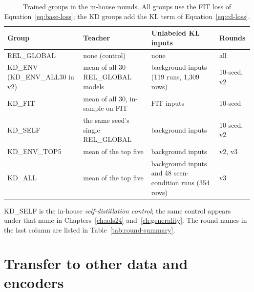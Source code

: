 \begin{table}[htbp]
\centering
\caption[Trained groups in the in-house rounds]{Trained groups in the in-house rounds. All groups use the FIT
loss of Equation~\ref{eq:base-loss}; the KD groups add the KL term of
Equation~\ref{eq:cd-loss}.}
\label{tab:variants}
\small
\begin{tabularx}{\textwidth}{@{}lXXl@{}}
\toprule
Group & Teacher & Unlabeled KL inputs & Rounds \\
\midrule
REL\_GLOBAL & none (control) & none & all \\
KD\_ENV (KD\_ENV\_ALL30 in v2) & mean of all 30 REL\_GLOBAL models
  & background inputs (119 runs, 1,309 rows) & 10-seed, v2 \\
KD\_FIT & mean of all 30, in-sample on FIT & FIT inputs & 10-seed \\
KD\_SELF & the same seed's single REL\_GLOBAL & background inputs
  & 10-seed, v2 \\
KD\_ENV\_TOP5 & mean of the top five & background inputs & v2, v3 \\
KD\_ALL & mean of the top five & background inputs and 48 seen-condition
  runs (354 rows) & v3 \\
\bottomrule
\end{tabularx}
\par\smallskip
\begin{minipage}{\textwidth}\footnotesize{}
KD\_SELF is the in-house \emph{self-distillation control}; the same
control appears under that name in Chapters~\ref{ch:ads24}
and~\ref{ch:generality}. The round names in the last column are
listed in Table~\ref{tab:round-summary}.
\end{minipage}
\end{table}

\section{Transfer to other data and encoders}
\label{sec:method-transfer}

